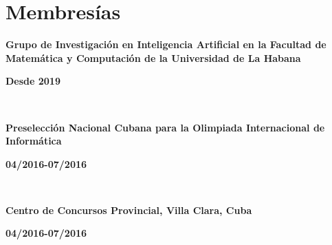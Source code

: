 \documentclass{article}
\begin{document}
\section*{Membresías}

\begin{minipage}{0.8\textwidth}
\parbox{0.8\linewidth}{\textbf{Grupo de Investigación en Inteligencia Artificial en la Facultad de Matemática y Computación de la Universidad de La Habana}} \hfill \textbf{Desde 2019}\
\
\end{minipage}\
\begin{minipage}{0.8\textwidth}
\parbox{0.8\linewidth}{\textbf{Preselección Nacional Cubana para la Olimpiada Internacional de Informática}} \hfill \textbf{04/2016-07/2016}\
\
\end{minipage}\
\begin{minipage}{0.8\textwidth}
\parbox{0.8\linewidth}{\textbf{Centro de Concursos Provincial, Villa Clara, Cuba}} \hfill \textbf{04/2016-07/2016}\
\
\end{minipage}\

\newpage
\end{document}
